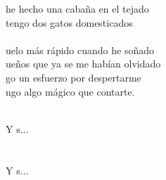 \begin{cancion}
	 he hecho una cabaña en el tejado\\
	 tengo dos gatos domesticados\\
\jump\\
	uelo más rápido cuando he soñado\\
	ueños que ya se me habían olvidado\\
	go un esfuerzo por despertarme\\
	ngo algo mágico que contarte.\\\jump\\
	\begin{chorus}%
	Y s... \\
\jump\\
	       \\
	Y s... \\
	\end{chorus}%
	\jump\\
\end{cancion}%
